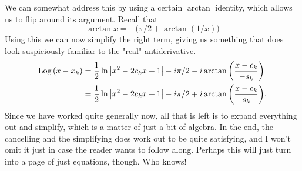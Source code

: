 We can somewhat address this by using a certain \( \arctan \) identity,
 which allows us to flip around its argument. Recall that
\[
    \arctan{x} = -\bigl( \pi/2 + \arctan{\left( 1/x \right)} \bigr)
\]
Using this we can now simplify the right term, giving us something that does
look suspiciously familiar to the "real" antiderivative.
\begin{align*}
    \operatorname{Log}{\left( x - x_k \right)} &= \frac{1}{2} \ln{\ensuremath{\left\lvert x^2 - 2c_k x + 1 \right\rvert}} - i \pi / 2 - i\arctan{\left( \frac{x - c_k}{-s_k} \right)} \\
    &= \frac{1}{2} \ln{\ensuremath{\left\lvert x^2 - 2c_k x + 1 \right\rvert}} - i \pi / 2 + i \arctan{\left( \frac{x - c_k}{s_k} \right)}
.\end{align*}
Since we have worked quite generally now, all that is left is to expand
everything out and simplify, which is a matter of just a bit of algebra. In the
end, the cancelling and the simplifying does work out to be quite satisfying,
and I won't omit it just in case the reader wants to follow along. Perhaps this
will just turn into a page of just equations, though. Who knows!
